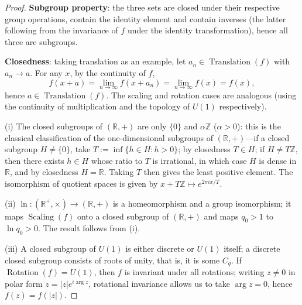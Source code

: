 \begin{proof}
\textbf{Subgroup property}: the three sets are closed under their respective group operations, contain the identity element and contain inverses (the latter following from the invariance of $f$ under the identity transformation), hence all three are subgroups.

\textbf{Closedness}: taking translation as an example, let $a_n\in\operatorname{Translation}(f)$ with $a_n\to a$. For any $x$, by the continuity of $f$,
\[
f(x+a)=\lim_{n\to\infty}f(x+a_n)=\lim_{n\to\infty}f(x)=f(x),
\]
hence $a\in\operatorname{Translation}(f)$. The scaling and rotation cases are analogous (using the continuity of multiplication and the topology of $U(1)$ respectively).

(i) The closed subgroups of $(\mathbb{R},+)$ are only $\{0\}$ and $\alpha\mathbb{Z}$ ($\alpha>0$): this is the classical classification of the one-dimensional subgroups of $(\mathbb{R},+)$---if a closed subgroup $H\neq\{0\}$, take $T:=\inf\{h\in H:h>0\}$; by closedness $T\in H$; if $H\neq T\mathbb{Z}$, then there exists $h\in H$ whose ratio to $T$ is irrational, in which case $H$ is dense in $\mathbb{R}$, and by closedness $H=\mathbb{R}$. Taking $T$ then gives the least positive element. The isomorphism of quotient spaces is given by $x+T\mathbb{Z}\mapsto e^{2\pi ix/T}$.

(ii) $\ln:(\mathbb{R}^+,\times)\to(\mathbb{R},+)$ is a homeomorphism and a group isomorphism; it maps $\operatorname{Scaling}(f)$ onto a closed subgroup of $(\mathbb{R},+)$ and maps $q_0>1$ to $\ln q_0>0$. The result follows from (i).

(iii) A closed subgroup of $U(1)$ is either discrete or $U(1)$ itself; a discrete closed subgroup consists of roots of unity, that is, it is some $C_q$. If $\operatorname{Rotation}(f)=U(1)$, then $f$ is invariant under all rotations; writing $z\neq0$ in polar form $z=|z|e^{i\arg z}$, rotational invariance allows us to take $\arg z=0$, hence $f(z)=f(|z|)$.
\end{proof}

